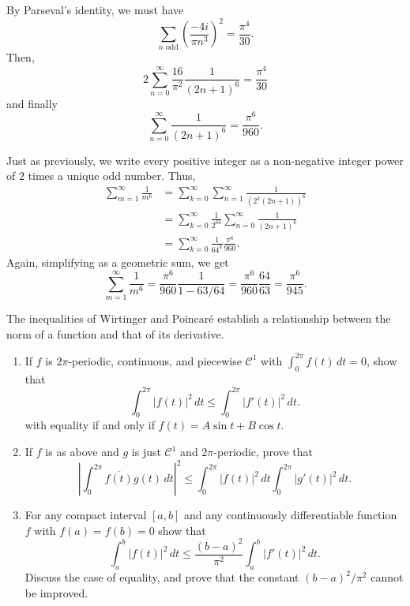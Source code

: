 \documentclass[12 pt, letterpaper]{hmcpset}
\begin{document}
\begin{solution}
\begin{enumerate}
			By Parseval's identity, we must have
			\[
				\sum_{n \text{ odd}} \left ( \frac{-4 i}{\pi n^{3}} \right )^{2} = \frac{\pi^{4}}{30}.
			\]
			Then,
			\[
				2 \sum_{n = 0}^{\infty} \frac{16}{\pi^{2}} \frac{1}{(2n + 1)^{6}} = \frac{\pi^{4}}{30}
			\]
			and finally
			\[
				\sum_{n = 0}^{\infty} \frac{1}{(2n + 1)^{6}} = \frac{\pi^{6}}{960}.
			\]

			Just as previously, we write every positive integer as a non-negative integer power of $2$ times a unique odd number. Thus,
			\begin{align*}
				\sum_{m = 1}^{\infty} \frac{1}{m^{6}} & = \sum_{k = 0}^{\infty} \sum_{n = 1}^{\infty} \frac{1}{(2^{k} (2n + 1))^{6}} \\
								      & = \sum_{k = 0}^{\infty} \frac{1}{2^{6k}} \sum_{n = 0}^{\infty} \frac{1}{(2n + 1)^{6}} \\
								      & = \sum_{k = 0}^{\infty} \frac{1}{64^{k}} \frac{\pi^{6}}{960}.
			\end{align*}
			Again, simplifying as a geometric sum, we get
			\[
				\sum_{m = 1}^{\infty} \frac{1}{m^{6}} = \frac{\pi^{6}}{960} \frac{1}{1 - 63/64} = \frac{\pi^{6}}{960} \frac{64}{63} = \frac{\pi^{6}}{945}.
			\]
	\end{enumerate}
\end{solution}

\pagebreak

\begin{problem}[S \& S \S 3.3 \#11]
	The inequalities of Wirtinger and Poincar\'e establish a relationship between the norm of a function and that of its derivative.
	\begin{enumerate}
		\item If $f$ is $2 \pi$-periodic, continuous, and piecewise $\mathcal{C}^{1}$ with $\int_{0}^{2 \pi} f(t) \, dt = 0$, show that
			\[
				\int_{0}^{2 \pi} \lvert f(t) \rvert^{2} \, dt \le \int_{0}^{2 \pi} \lvert f'(t) \rvert^{2} \, dt.
			\]
			with equality if and only if $f(t) = A \sin{t} + B \cos{t}$.
		\item If $f$ is as above and $g$ is just $\mathcal{C}^{1}$ and $2 \pi$-periodic, prove that
			\[
				\left \lvert \int_{0}^{2 \pi} \overline{f(t)} g(t) \, dt  \right \rvert^{2} \le \int_{0}^{2 \pi} \lvert f(t) \rvert^{2} \, dt \int_{0}^{2 \pi} \lvert g'(t) \rvert^{2} \, dt.
			\]
		\item For any compact interval $[a, b]$ and any continuously differentiable function $f$ with $f(a) = f(b) = 0$  show that
			\[
				\int_{a}^{b} \lvert f(t) \rvert^{2} \, dt \le \frac{(b - a)^{2}}{\pi^{2}} \int_{a}^{b} \lvert f'(t) \rvert^{2} \, dt.
			\]
			Discuss the case of equality, and prove that the constant $(b - a)^{2} / \pi^{2}$ cannot be improved.
	\end{enumerate}
\end{problem}
\end{document}
